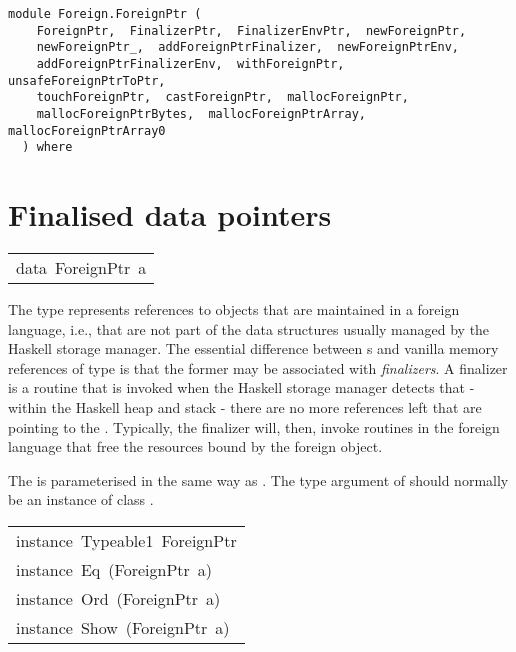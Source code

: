 \label{module:Foreign.ForeignPtr}
\haddockbeginheader
{\haddockverb\begin{verbatim}
module Foreign.ForeignPtr (
    ForeignPtr,  FinalizerPtr,  FinalizerEnvPtr,  newForeignPtr, 
    newForeignPtr_,  addForeignPtrFinalizer,  newForeignPtrEnv, 
    addForeignPtrFinalizerEnv,  withForeignPtr,  unsafeForeignPtrToPtr, 
    touchForeignPtr,  castForeignPtr,  mallocForeignPtr, 
    mallocForeignPtrBytes,  mallocForeignPtrArray,  mallocForeignPtrArray0
  ) where\end{verbatim}}
\haddockendheader

\section{Finalised data pointers
}
\begin{haddockdesc}
\item[\begin{tabular}{@{}l}
data\ ForeignPtr\ a
\end{tabular}]\haddockbegindoc
The type  represents references to objects that are
 maintained in a foreign language, i.e., that are not part of the
 data structures usually managed by the Haskell storage manager.
 The essential difference between s and vanilla memory
 references of type  is that the former may be associated
 with \emph{finalizers}. A finalizer is a routine that is invoked when
 the Haskell storage manager detects that - within the Haskell heap
 and stack - there are no more references left that are pointing to
 the .  Typically, the finalizer will, then, invoke
 routines in the foreign language that free the resources bound by
 the foreign object.
\par
The  is parameterised in the same way as .  The
 type argument of  should normally be an instance of
 class .
\par

\end{haddockdesc}
\begin{haddockdesc}
\item[\begin{tabular}{@{}l}
instance\ Typeable1\ ForeignPtr\\instance\ Eq\ (ForeignPtr\ a)\\instance\ Ord\ (ForeignPtr\ a)\\instance\ Show\ (ForeignPtr\ a)
\end{tabular}]
\end{haddockdesc}
